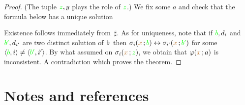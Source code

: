 \documentclass[creche.tex]{subfiles}
\begin{document}
\begin{proof}

(The tuple ${\color{green} z},y$ plays the role of ${\color{green} z}$.)  We fix some $a$ and check that the formula below has a unique solution


Existence follows immediately from $\,\sharp$.
As for uniqueness, note that if ${\color{green} b},d_i$ and ${\color{green} b'},d_{i'}$ are two distinct solution of $\,\flat\,$ then $\sigma_i({\color{brown} x}\,;{\color{green} b})\leftrightarrow\sigma_{i'}({\color{brown} x}\,;{\color{green} b'})$ for some $\langle{\color{green}b},i\rangle\neq\langle{\color{green}b'},i'\rangle$.
By what assumed on $\sigma_i({\color{brown} x}\,;{\color{green} z})$, we obtain that $\varphi({\color{brown} x}\,;a)$ is inconsistent.
A contradiction which proves the theorem.
\end{proof}


\section{Notes and references}
\begin{biblist}[]\normalsize




\end{biblist}
\end{document}
